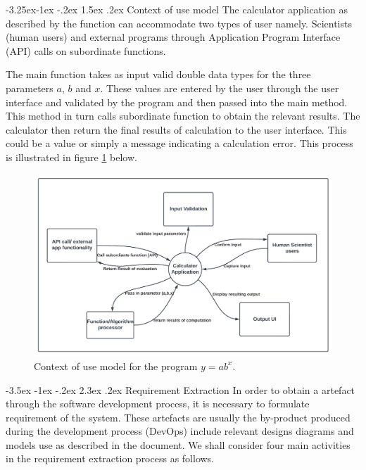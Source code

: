 \documentclass[11pt]{article}
\makeatletter
\renewcommand\section{\@startsection {section}{1}{\z@}%
                                       {-3.5ex \@plus -1ex \@minus -.2ex}%
                                       {2.3ex \@plus.2ex}%
                                       {\normalfont\fontfamily{phv}\fontsize{16}{19}\bfseries}}
\renewcommand\subsection{\@startsection{subsection}{2}{\z@}%
                                         {-3.25ex\@plus -1ex \@minus -.2ex}%
                                         {1.5ex \@plus .2ex}%
                                         {\normalfont\fontfamily{phv}\fontsize{14}{17}\bfseries}}
\makeatother
\begin{document}
\subsection{Context of use model}
The calculator application as described by the function can accommodate two types of user namely. Scientists (human users) and external programs through Application Program Interface (API) calls on subordinate functions.\par
The main function takes as input valid double data types for the three parameters $a$, $b$ and $x$. These values are entered by the user through the user interface and validated by the program and then passed into the main method. This method in turn calls subordinate function to obtain the relevant results. The calculator then return the final results of calculation to the user interface. This could be a value or simply a message indicating a calculation error. This process is illustrated in figure \ref{fig3} below.
\begin{figure}[H]
	\centering
	\includegraphics[width=\linewidth]{Figures/ContextDiagram}
	\caption{Context of use model for the program $y=ab^x$.}
	\label{fig3}
\end{figure}

\section{Requirement Extraction} \label{s:sec2}
In order to obtain a artefact through the software development process, it is necessary to formulate requirement of the system. These artefacts are usually the by-product produced during the development process (DevOps) include relevant designs diagrams and models use as described in the document. We shall consider four main activities in the requirement extraction process as follows.
\end{document}
